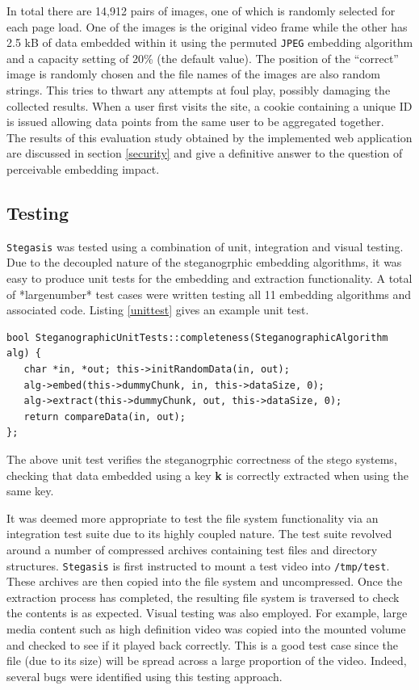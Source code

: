 \documentclass[paper=a4, fontsize=11pt,twoside]{scrartcl}
\numberwithin{table}{section}
\numberwithin{figure}{section}
\numberwithin{algorithm}{section}
\begin{document}
In total there are 14,912 pairs of images, one of which is randomly selected for each page load. One of the images is the original video frame while the other has 2.5 kB of data embedded within it using the permuted \texttt{JPEG} embedding algorithm and a capacity setting of 20\% (the default value). The position of the ``correct'' image is randomly chosen and the file names of the images are also random strings. This tries to thwart any attempts at foul play, possibly damaging the collected results. When a user first visits the site, a cookie containing a unique ID is issued allowing data points from the same user to be aggregated together.\\

\noindent
The results of this evaluation study obtained by the implemented web application are discussed in section \ref{security} and give a definitive answer to the question of perceivable embedding impact.

\subsection{Testing}
\label{testing}

\texttt{Stegasis} was tested using a combination of unit, integration and visual testing. Due to the decoupled nature of the steganogrphic embedding algorithms, it was easy to produce unit tests for the embedding and extraction functionality. A total of *largenumber* test cases were written testing all 11 embedding algorithms and associated code. Listing \ref{unittest} gives an example unit test.

\begin{lstlisting}[caption={Embedding algorithm unit test (\texttt{steg/steg\_algorithm\_test.cc:100}).}, frame=single, label=unittest]
bool SteganographicUnitTests::completeness(SteganographicAlgorithm alg) {
   char *in, *out; this->initRandomData(in, out);
   alg->embed(this->dummyChunk, in, this->dataSize, 0); 
   alg->extract(this->dummyChunk, out, this->dataSize, 0);
   return compareData(in, out);
};
\end{lstlisting}

The above unit test verifies the steganogrphic correctness of the stego systems, checking that data embedded using a key \textbf{k} is correctly extracted when using the same key.

It was deemed more appropriate to test the file system functionality via an integration test suite due to its highly coupled nature. The test suite revolved around a number of compressed archives containing test files and directory structures. \texttt{Stegasis} is first instructed to mount a test video into \texttt{/tmp/test}. These archives are then copied into the file system and uncompressed. Once the extraction process has completed, the resulting file system is traversed to check the contents is as expected. Visual testing was also employed. For example, large media content such as high definition video was copied into the mounted volume and checked to see if it played back correctly. This is a good test case since the file (due to its size) will be spread across a large proportion of the video. Indeed, several bugs were identified using this testing approach.
\end{document}
